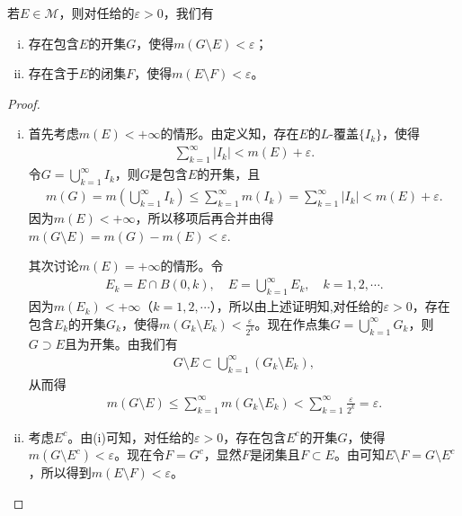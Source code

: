 \documentclass[../../main.tex]{subfiles}%
\begin{document}
\begin{theorem}\label{theorem:定理2.13}
若$E\in\mathscr{M}$，则对任给的$\varepsilon > 0$，我们有
\begin{enumerate}[(i)]
\item 存在包含$E$的开集$G$，使得$m(G\setminus E)<\varepsilon$；
\item 存在含于$E$的闭集$F$，使得$m(E\setminus F)<\varepsilon$。
\end{enumerate}
\end{theorem}
\begin{proof}
\begin{enumerate}[(i)]
\item 首先考虑$m(E)<+\infty$的情形。由定义知，存在$E$的$L$-覆盖$\{I_k\}$，使得
\begin{align*}
\sum_{k = 1}^{\infty}|I_k|<m(E)+\varepsilon.
\end{align*}
令$G = \bigcup_{k = 1}^{\infty}I_k$，则$G$是包含$E$的开集，且
\begin{align*}
m\left( G \right) =m\left( \bigcup_{k=1}^{\infty}{I_k} \right) \leqslant \sum_{k=1}^{\infty}{m\left( I_k \right)}=\sum_{k=1}^{\infty}{\left| I_k \right|}<m(E)+\varepsilon .
\end{align*}
因为$m(E)<+\infty$，所以移项后再合并由得$m(G\setminus E)=m(G)-m(E)<\varepsilon.$

其次讨论$m(E)=+\infty$的情形。令
\begin{align*}
E_k = E\cap B(0,k),\quad E=\bigcup_{k = 1}^{\infty}E_k,\quad k = 1,2,\cdots.
\end{align*}
因为$m(E_k)<+\infty$（$k = 1,2,\cdots$），所以由上述证明知,对任给的$\varepsilon>0$，存在包含$E_k$的开集$G_k$，使得$m(G_k\setminus E_k)<\frac{\varepsilon}{2^k}$。现在作点集$G = \bigcup_{k = 1}^{\infty}G_k$，则$G\supset E$且为开集。由我们有
\begin{align*}
G\setminus E\subset\bigcup_{k = 1}^{\infty}(G_k\setminus E_k),
\end{align*}
从而得
\begin{align*}
m(G\setminus E)\leqslant\sum_{k = 1}^{\infty}m(G_k\setminus E_k)<\sum_{k = 1}^{\infty}\frac{\varepsilon}{2^k}=\varepsilon.
\end{align*}
\item 考虑$E^c$。由(i)可知，对任给的$\varepsilon>0$，存在包含$E^c$的开集$G$，使得$m(G\setminus E^c)<\varepsilon$。现在令$F = G^c$，显然$F$是闭集且$F\subset E$。由可知$E\setminus F = G\setminus E^c$，所以得到$m(E\setminus F)<\varepsilon$。
\end{enumerate}

\end{proof}
\end{document}
